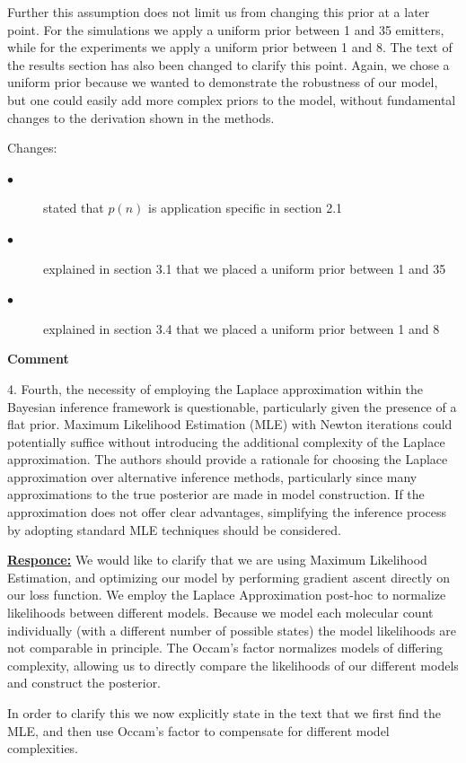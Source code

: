 \documentclass{article}
\begin{document}
Further this assumption does not limit us from changing this prior at a later point. For the simulations 
we apply a uniform prior between 1 and 35 emitters, while for the experiments we apply a uniform prior between 1 and 8. 
The text of the results section has also been changed to clarify this point.
Again, we chose a uniform prior because we wanted to demonstrate the robustness of our model, but one could easily 
add more complex priors to the model, without fundamental changes to the derivation shown in the methods. 

Changes:
\begin{description}
    \item[$\bullet$] stated that $p(n)$ is application specific in section 2.1
    \item[$\bullet$] explained in section 3.1 that we placed a uniform prior between 1 and 35
    \item[$\bullet$] explained in section 3.4 that we placed a uniform prior between 1 and 8
\end{description}

\textbf{Comment}

 4.	Fourth, the necessity of employing the Laplace approximation within the 
 Bayesian inference framework is questionable, particularly given the presence of a flat prior. 
 Maximum Likelihood Estimation (MLE) with Newton iterations could potentially suffice without 
 introducing the additional complexity of the Laplace approximation. 
 The authors should provide a rationale for choosing the Laplace approximation over 
 alternative inference methods, particularly since many approximations to the true 
 posterior are made in model construction. If the approximation does not offer clear advantages, 
 simplifying the inference process by adopting standard MLE techniques should be considered.

 \underline{\textbf{Responce:}}
 We would like to clarify that we are using Maximum Likelihood Estimation, and optimizing our model 
 by performing gradient ascent directly on our loss function. We employ the Laplace Approximation 
 post-hoc to normalize likelihoods between different models. Because we model each molecular count 
 individually (with a different number of possible states) the model likelihoods are not comparable 
 in principle. The Occam's factor normalizes models of differing complexity, allowing us to directly 
 compare the likelihoods of our different models and construct the posterior.

 In order to clarify this we now explicitly state in the text that we first find the MLE, and then use Occam's factor to compensate 
 for different model complexities.
\end{document}
